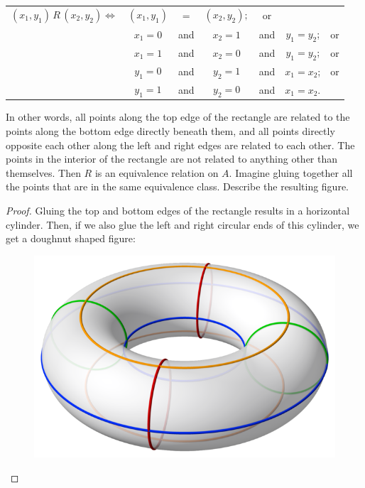 \documentclass[14pt]{extarticle}
\begin{document}
\begin{center}
        \begin{tabular}{ccccccc}
                \((x_1, y_1) \,R\, (x_2, y_2) \iff\) & \((x_1, y_1)\) & =   & \((x_2, y_2);\) & or                        \\
                                                     & \(x_1=0\)      & and & \(x_2=1\)       & and & \(y_1 = y_2\); & or \\
                                                     & \(x_1=1\)      & and & \(x_2=0\)       & and & \(y_1 = y_2\); & or \\
                                                     & \(y_1=0\)      & and & \(y_2=1\)       & and & \(x_1 = x_2\); & or \\
                                                     & \(y_1=1\)      & and & \(y_2=0\)       & and & \(x_1 = x_2\).
        \end{tabular}
\end{center}

In other words, all points along the top edge of the rectangle are related to the points along the bottom edge
directly beneath them, and all points directly opposite each other along the left and right edges are related to
each other. The points in the interior of the rectangle are not related to anything other than themselves. Then $R$ is
an equivalence relation on $A$. Imagine gluing together all the points that are in the same equivalence class. Describe
the resulting figure.

\begin{proof}
        Gluing the top and bottom edges of the rectangle results in a horizontal cylinder. Then, if we also glue the left and
        right circular ends of this cylinder, we get a doughnut shaped figure:

        \begin{figure}[ht!]
                \centering
                \includegraphics[scale=0.2]{../images/8.3.33.png}
        \end{figure}
\end{proof}
\end{document}
